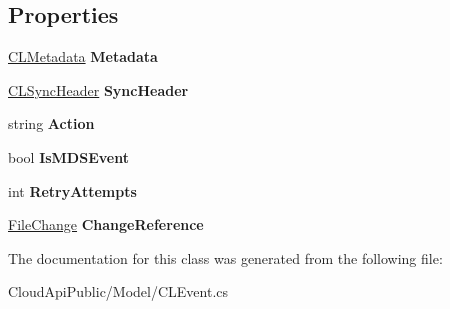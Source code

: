 \subsection*{Properties}
\begin{DoxyCompactItemize}
\item 
\hypertarget{class_cloud_api_public_1_1_model_1_1_c_l_event_a2f9e2c339a8b6fdf0ef634626b8463e8}{\hyperlink{class_cloud_api_public_1_1_model_1_1_c_l_metadata}{C\-L\-Metadata} {\bfseries Metadata}}\label{class_cloud_api_public_1_1_model_1_1_c_l_event_a2f9e2c339a8b6fdf0ef634626b8463e8}

\item 
\hypertarget{class_cloud_api_public_1_1_model_1_1_c_l_event_a0ad5d90f911fbfdc6cd72221e4cffdbc}{\hyperlink{class_cloud_api_public_1_1_model_1_1_c_l_sync_header}{C\-L\-Sync\-Header} {\bfseries Sync\-Header}}\label{class_cloud_api_public_1_1_model_1_1_c_l_event_a0ad5d90f911fbfdc6cd72221e4cffdbc}

\item 
\hypertarget{class_cloud_api_public_1_1_model_1_1_c_l_event_a6db45ee4c75d16aeed721ae879b87f11}{string {\bfseries Action}}\label{class_cloud_api_public_1_1_model_1_1_c_l_event_a6db45ee4c75d16aeed721ae879b87f11}

\item 
\hypertarget{class_cloud_api_public_1_1_model_1_1_c_l_event_ad6aedf2e5fd33c48ad8ee52425732571}{bool {\bfseries Is\-M\-D\-S\-Event}}\label{class_cloud_api_public_1_1_model_1_1_c_l_event_ad6aedf2e5fd33c48ad8ee52425732571}

\item 
\hypertarget{class_cloud_api_public_1_1_model_1_1_c_l_event_a4d11b253b754a0ba67bc3d378392a873}{int {\bfseries Retry\-Attempts}}\label{class_cloud_api_public_1_1_model_1_1_c_l_event_a4d11b253b754a0ba67bc3d378392a873}

\item 
\hypertarget{class_cloud_api_public_1_1_model_1_1_c_l_event_a5d843c280c1d2063f555cbb3220d2c3c}{\hyperlink{class_cloud_api_public_1_1_model_1_1_file_change}{File\-Change} {\bfseries Change\-Reference}}\label{class_cloud_api_public_1_1_model_1_1_c_l_event_a5d843c280c1d2063f555cbb3220d2c3c}

\end{DoxyCompactItemize}


The documentation for this class was generated from the following file\-:\begin{DoxyCompactItemize}
\item 
Cloud\-Api\-Public/\-Model/C\-L\-Event.\-cs\end{DoxyCompactItemize}

